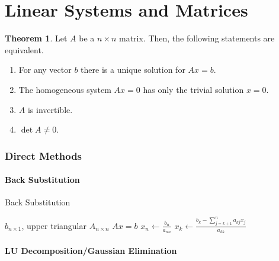 \documentclass[fleqn, a4paper, 12pt, twoside, titlepage]{article}
\theoremstyle{definition}
\theoremstyle{theorem}
\newtheorem{theorem}{Theorem}
\begin{document}
\newpage
\part{Linear Systems and Matrices}

\begin{theorem}
	Let $A$ be a $n \times n$ matrix.
	Then, the following statements are equivalent.
	\begin{enumerate}
		\item For any vector $b$ there is a unique solution for $A x = b$.
		\item The homogeneous system $A x = 0$ has only the trivial solution $x = 0$.
		\item $A$ is invertible.
		\item $\det A \neq 0$.
	\end{enumerate}
\end{theorem}

\section{Direct Methods}

\subsection{Back Substitution}

\begin{algorithm}
	\caption{Back Substitution}
	\begin{algorithmic}[1]
		\Require $b_{n \times 1}$, upper triangular $A_{n \times n}$
		\Ensure $A x = b$
		\State $x_n \gets \frac{b_n}{a_{n n}}$
			\State $x_k \gets \frac{b_k - \sum\limits_{j = k + 1}^{n} a_{k j} x_j}{a_{k k}}$
		\EndFor
	\end{algorithmic}
	\label{alg:Back_Substitution}
\end{algorithm}

\subsection{LU Decomposition/Gaussian Elimination}
\end{document}
